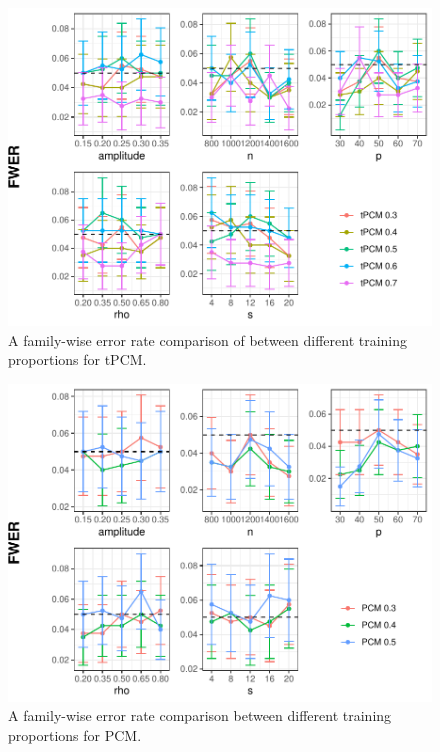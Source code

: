 \documentclass[12pt]{article}
\theoremstyle{definition}
\theoremstyle{remark}
\begin{document}
\begin{figure}
	\centering
	\includegraphics{figures/fwer_tPCM_choose_proportion.pdf}
	\caption{A family-wise error rate comparison of between  different training proportions for tPCM.}
	\label{fig:tPCM FWER proportion}
\end{figure}

\begin{figure}
	\centering
	\includegraphics{figures/fwer_PCM_choose_proportion.pdf}
	\caption{A family-wise error rate comparison between different training proportions for PCM.}
	\label{fig:PCM FWER proportion}
\end{figure}
\end{document}
